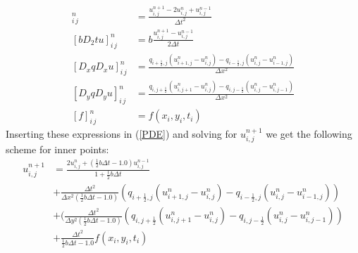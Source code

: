 \documentclass[twoside]{article}
\begin{document}
\begin{align}
[D_t D_t u]_{i\, j}^n &= \frac{u^{n+1}_{i,j} - 2u^{n}_{i,j} + u^{n-1}_{i,j}}{\Delta t^2} \label{Dttu}\\
[bD_2t u]_{i\, j}^n &= b\frac{u^{n+1}_{i,j} - u^{n-1}_{i,j}}{2\Delta t} \label{bD2tu}\\
[D_x q D_x u]_{i\, j}^n &= \frac{q_{i +\frac{1}{2},j}(u^{n}_{i+1,j} - u^{n}_{i,j}) - q_{i -\frac{1}{2},j}(u^{n}_{i,j} - u^{n}_{i-1,j})}{\Delta x^2} \label{DxqDxu}\\
[D_y q D_y u]_{i\, j}^n &= \frac{q_{i,j +\frac{1}{2}}(u^{n}_{i,j+1} - u^{n}_{i,j}) - q_{i ,j-\frac{1}{2}}(u^{n}_{i,j} - u^{n}_{i,j-1})}{\Delta x^2} \label{DyqDyu}\\
[f]_{i\, j}^n &= f(x_i, y_i, t_i) \label{f}
\end{align}
Inserting these expressions in (\ref{PDE}) and solving for $u^{n+1}_{i,j}$ we get the following scheme for inner points:
\begin{align*}
u^{n+1}_{i,j} &= \frac{2u^{n}_{i,j} + (\frac{1}{2}b\Delta t-1.0) u^{n-1}_{i,j}}{1 + \frac{1}{2}b\Delta t} \\
&+ \frac{\Delta t^2}{\Delta x^2(\frac{1}{2}b\Delta t-1.0)}({q_{i +\frac{1}{2},j}(u^{n}_{i+1,j} - u^{n}_{i,j}) - q_{i -\frac{1}{2},j}(u^{n}_{i,j} - u^{n}_{i-1,j})}) \\ 
&+  (\frac{\Delta t^2}{\Delta y^2(\frac{1}{2}b\Delta t-1.0)} (q_{i,j +\frac{1}{2}}(u^{n}_{i,j+1} - u^{n}_{i,j}) - q_{i ,j-\frac{1}{2}}(u^{n}_{i,j} - u^{n}_{i,j-1}))\\
 &+ \frac{\Delta t^2} {\frac{1}{2}b\Delta t-1.0} f(x_i, y_i, t_i)
\end{align*}
\end{document}
